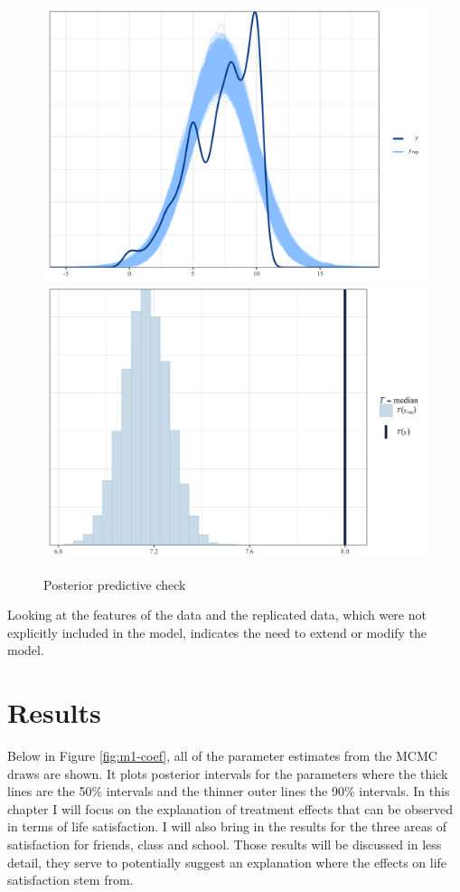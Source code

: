 \documentclass[a4, 12pt]{article}
\begin{document}
\begin{figure}[H]
\includegraphics[width=0.5\linewidth,]{../figures/post_dens_overlay} \includegraphics[width=0.5\linewidth,]{../figures/post_skew} \caption{Posterior predictive check}\label{fig:post-dens-overlay}
\end{figure}

Looking at the features of the data and the replicated data, which were not explicitly included in the model, indicates the need to extend or modify the model.

\clearpage

\hypertarget{results}{%
\section{Results}\label{results}}

\label{ch:results}
Below in Figure \ref{fig:m1-coef}, all of the parameter estimates from the MCMC draws are shown. It plots posterior intervals for the parameters where the thick lines are the 50\% intervals and the thinner outer lines the 90\% intervals. In this chapter I will focus on the explanation of treatment effects that can be observed in terms of life satisfaction. I will also bring in the results for the three areas of satisfaction for friends, class and school. Those results will be discussed in less detail, they serve to potentially suggest an explanation where the effects on life satisfaction stem from.
\end{document}
